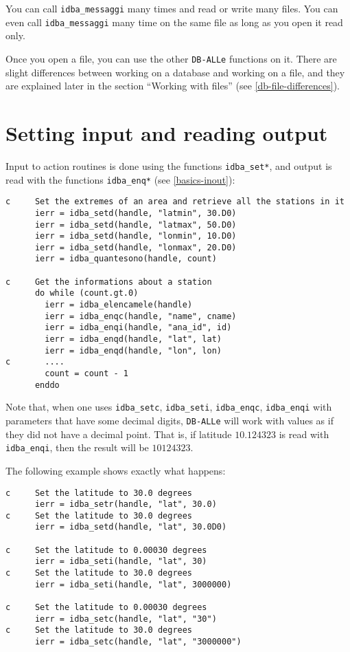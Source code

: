 \documentclass[final,12pt,a4paper,twoside]{book}
\newcommand{\dballe}{{\tt DB-ALLe}}
\begin{document}
You can call {\tt idba\_messaggi} many times and read or write many files.  You
can even call {\tt idba\_messaggi} many time on the same file as long as you
open it read only.

Once you open a file, you can use the other \dballe{} functions on it.  There
are slight differences between working on a database and working on a file, and
they are explained later in the section ``Working with files'' (see \ref{db-file-differences}).


\section{Setting input and reading output}

Input to action routines is done using the functions {\tt idba\_set*}, and output
is read with the functions {\tt idba\_enq*} (see \ref{basics-inout}):

\begin{verbatim}
c     Set the extremes of an area and retrieve all the stations in it
      ierr = idba_setd(handle, "latmin", 30.D0)
      ierr = idba_setd(handle, "latmax", 50.D0)
      ierr = idba_setd(handle, "lonmin", 10.D0)
      ierr = idba_setd(handle, "lonmax", 20.D0)
      ierr = idba_quantesono(handle, count)
   
c     Get the informations about a station
      do while (count.gt.0)
        ierr = idba_elencamele(handle)
        ierr = idba_enqc(handle, "name", cname)
        ierr = idba_enqi(handle, "ana_id", id)
        ierr = idba_enqd(handle, "lat", lat)
        ierr = idba_enqd(handle, "lon", lon)
c       ....
        count = count - 1
      enddo
\end{verbatim}

Note that, when one uses {\tt idba\_setc}, {\tt idba\_seti}, {\tt idba\_enqc},
{\tt idba\_enqi} with parameters that have some decimal digits, \dballe{} will
work with values as if they did not have a decimal point.  That is, if latitude
$10.124323$ is read with {\tt idba\_enqi}, then the result will be $10124323$.

The following example shows exactly what happens:

\begin{verbatim}
c     Set the latitude to 30.0 degrees
      ierr = idba_setr(handle, "lat", 30.0)
c     Set the latitude to 30.0 degrees
      ierr = idba_setd(handle, "lat", 30.0D0)

c     Set the latitude to 0.00030 degrees
      ierr = idba_seti(handle, "lat", 30)
c     Set the latitude to 30.0 degrees
      ierr = idba_seti(handle, "lat", 3000000)

c     Set the latitude to 0.00030 degrees
      ierr = idba_setc(handle, "lat", "30")
c     Set the latitude to 30.0 degrees
      ierr = idba_setc(handle, "lat", "3000000")
\end{verbatim}
\end{document}
